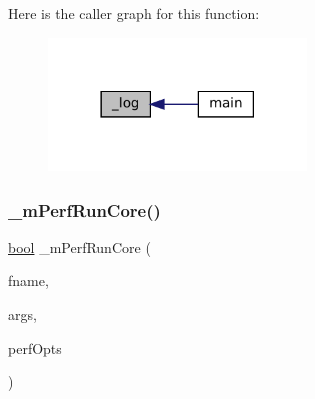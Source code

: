 Here is the caller graph for this function\+:
\nopagebreak
\begin{figure}[H]
\begin{center}
\leavevmode
\includegraphics[width=194pt]{perf-main_8c_ab638d8a3b5157696f6a07239141bcd51_icgraph}
\end{center}
\end{figure}
\mbox{\label{perf-main_8c_aa853b44038d99a0c66c0961c5c1b0d66}} 
\subsubsection{\texorpdfstring{\+\_\+m\+Perf\+Run\+Core()}{\_mPerfRunCore()}}
{\footnotesize\ttfamily \mbox{\hyperlink{libretro_8h_a4a26dcae73fb7e1528214a068aca317e}{bool}} \+\_\+m\+Perf\+Run\+Core (\begin{DoxyParamCaption}\item[{const char $\ast$}]{fname,  }\item[{const struct m\+Arguments $\ast$}]{args,  }\item[{const struct Perf\+Opts $\ast$}]{perf\+Opts }\end{DoxyParamCaption})\hspace{0.3cm}{\ttfamily [static]}}

